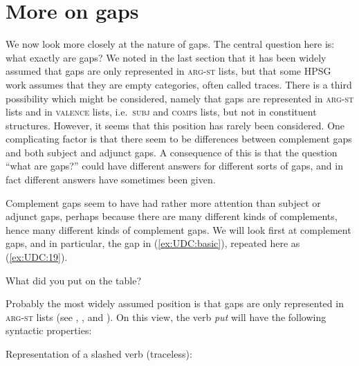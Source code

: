 \documentclass[output=paper
,notxmath 
 	        ,biblatex
                ,babelshorthands
                ,newtxmath
                ,draftmode
                ,colorlinks, citecolor=brown
]{langscibook}
\begin{document}
\section{More on gaps}
\label{sec:UDC:MoreOnGaps}


We now look more closely at the nature of gaps. The central question
here is: what exactly are gaps? We noted in the last section that it
has been widely assumed that gaps are only represented in
\textsc{arg-st} lists, but that some HPSG work assumes that they are
empty categories, often called traces. There is a third possibility
which might be considered, namely that gaps are represented in
\textsc{arg-st} lists and in \textsc{valence} lists,
i.e.\ \textsc{subj} and \textsc{comps} lists, but not in constituent
structures. However, it seems that this position has rarely been
considered. One complicating factor is that there seem to be
differences between complement gaps and both subject and adjunct
gaps. A consequence of this is that the question ``what are gaps?''
could have different answers for different sorts of gaps, and in fact
different answers have sometimes been given.

Complement gaps seem to have had rather more attention than subject or
adjunct gaps, perhaps because there are many different kinds of
complements, hence many different kinds of complement gaps. We will look
first at complement gaps, and in particular, the gap in (\ref{ex:UDC:basic}), repeated
here as (\ref{ex:UDC:19}).

\begin{exe}
\ex \label{ex:UDC:19}
What did you put \trace{} on the table?
\end{exe}

\noindent
Probably the most widely assumed position is that gaps are only
represented in \textsc{arg-st} lists
(see \citealt[Section~4.1]{Sag:97},
\citealt*[Section~2.2]{Bouma:Malouf:Sag:01},
\citealt[Chapter~5.1]{Ginzburg:Sag:01} and \citealt[508]{Sag:10a}). On
this view, the verb \textit{put} will have the
following syntactic properties:

\ea
\label{udc:ex-slashed-verb-traceless}
Representation of a slashed verb (traceless):\\
\z
\end{document}
